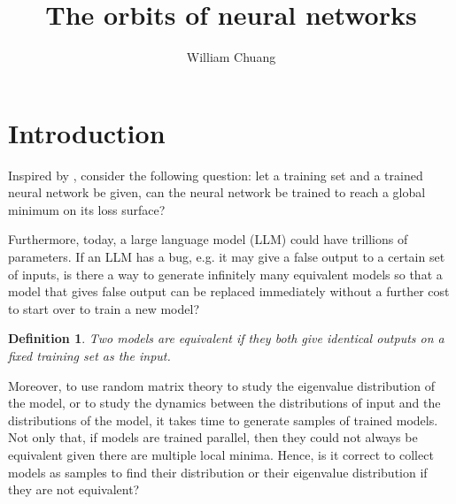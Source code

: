 \documentclass{article}
\theoremstyle{plain}
\theoremstyle{plain} %
\newtheorem{definition}[theorem]{Definition}
\theoremstyle{definition}  %
\theoremstyle{remark}  %
\theoremstyle{plain}
\begin{document}
\title{The orbits of neural networks}

\author{William Chuang}

\maketitle


\section{Introduction}
Inspired by \cite{yun2017global, blum1988training, judd1990neural}, consider the following question:
let a training set and a trained neural network be given, can the neural network be trained to reach a global minimum on its loss surface?




Furthermore, today, a large language model (LLM) could have trillions of parameters. If an LLM has a bug, e.g. it may give a false output to a certain set of inputs, is there a way to generate infinitely many equivalent models so that a model that gives false output can be replaced immediately without a further cost to start over to train a new model?

\begin{definition}
\textit{Two models are equivalent} if they both give identical outputs on a fixed training set as the input.
\end{definition}

Moreover, to use random matrix theory to study the eigenvalue distribution of the model, or to study the dynamics between the distributions of input and the distributions of the model, it takes time to generate samples of trained models. Not only that, if models are trained parallel, then they could not always be equivalent given there are multiple local minima. Hence, is it correct to collect models as samples to find their distribution or their eigenvalue distribution if they are not equivalent?
\end{document}

